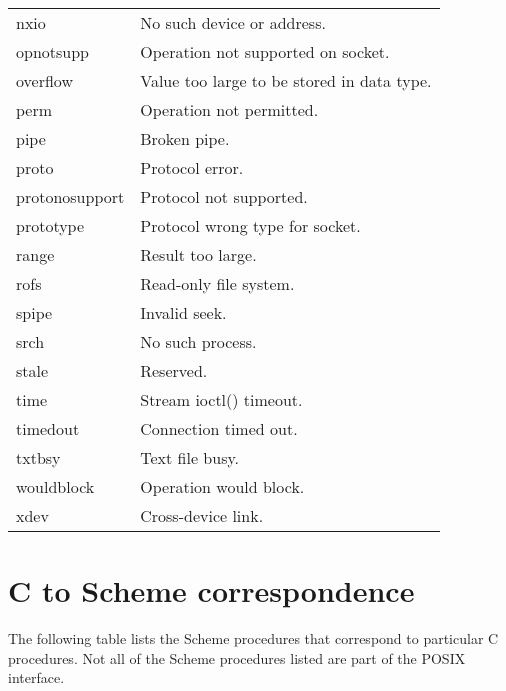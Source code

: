 \begin{center}
\begin{longtable}{@{\ttfamily}lp{}}
   nxio				& No such device or address.\\
   opnotsupp			  & Operation not supported on socket.\\
   overflow		  & Value too large to be stored in data type.\\
   perm				& Operation not permitted.\\
   pipe				& Broken pipe.\\
   proto				& Protocol error.\\
   protonosupport			& Protocol not supported.\\
   prototype			     & Protocol wrong type for socket.\\
   range				& Result too large.\\
   rofs				& Read-only file system.\\
   spipe				& Invalid seek.\\
   srch				& No such process.\\
   stale				& Reserved.\\
   time			     & Stream ioctl() timeout. \\
   timedout				& Connection timed out.\\
   txtbsy				& Text file busy.\\
   wouldblock	& Operation would block.\\
   xdev				& Cross-device link.\\
\end{longtable}
\end{center}

\section{C to Scheme correspondence}
\label{function-correspondence}

The following table lists the Scheme procedures that correspond to
 particular C procedures.
Not all of the Scheme procedures listed are part of the POSIX interface.

